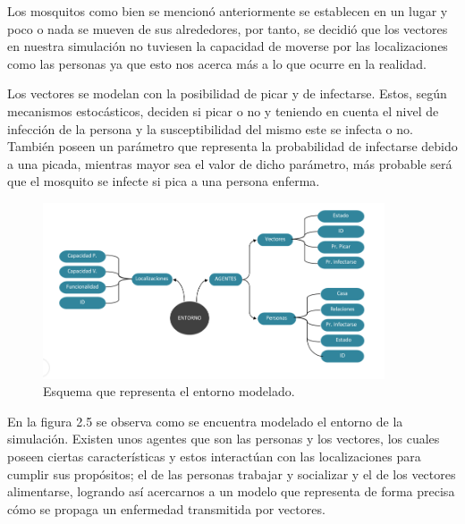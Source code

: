 Los mosquitos como bien se mencionó anteriormente se establecen en un lugar y poco o nada se mueven de 
sus alrededores, por tanto, se decidió que los vectores en nuestra simulación no tuviesen la capacidad de moverse por
las localizaciones como las personas ya que esto nos acerca más a lo que ocurre en la realidad.

Los vectores se modelan con la posibilidad de picar y de infectarse. Estos, según mecanismos estocásticos,
deciden si picar o no y teniendo en cuenta el nivel de infección de la persona y la susceptibilidad del mismo este
se infecta o no. También poseen un parámetro que representa la probabilidad de infectarse debido a una picada, mientras
mayor sea el valor de dicho parámetro, más probable será que el mosquito se infecte si pica a una persona enferma.

\begin{figure}[htb]
    \centering
    \includegraphics[width=0.9\textwidth]{Graphics/Modelo.png}
    \caption{Esquema que representa el entorno modelado.}
\end{figure}
En la figura 2.5 se observa como se encuentra modelado el entorno de la simulación. Existen unos agentes que son las
personas y los vectores, los cuales poseen ciertas características y estos interactúan con las localizaciones para
cumplir sus propósitos; el de las personas trabajar y socializar y el de los vectores alimentarse, logrando así
acercarnos a un modelo que representa de forma precisa cómo se propaga un enfermedad transmitida por vectores.

